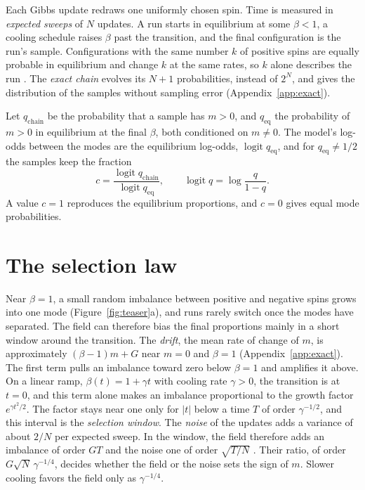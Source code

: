 \documentclass[final]{dynafront2026}
\newcommand{\qeq}{q_{\mathrm{eq}}}
\newcommand{\qchain}{q_{\mathrm{chain}}}
\DeclareMathOperator{\logit}{logit}
\begin{document}
Each Gibbs update redraws one uniformly chosen spin. Time is measured in \emph{expected sweeps} of $N$ updates. A run
starts in equilibrium at some $\beta<1$, a cooling schedule raises $\beta$
past the transition, and the final configuration is the run's sample. Configurations with
the same number $k$ of positive spins are equally probable in equilibrium and
change $k$ at the same rates, so $k$ alone describes the run
\citep{levinluczak2010}. The \emph{exact chain} evolves its $N+1$
probabilities, instead of $2^N$, and gives the distribution of the samples
without sampling error (Appendix~\ref{app:exact}).

Let $\qchain$ be the probability that a sample has $m>0$, and $\qeq$ the
probability of $m>0$ in equilibrium at the final $\beta$, both conditioned on
$m\ne0$. The model's log-odds between the modes are the equilibrium log-odds,
$\logit\qeq$, and for $\qeq\ne1/2$ the samples keep the fraction
\begin{equation}
 c=\frac{\logit\qchain}{\logit\qeq},
 \qquad \logit q=\log\frac{q}{1-q}.
 \label{eq:c}
\end{equation}
A value $c=1$ reproduces the equilibrium proportions, and $c=0$ gives equal
mode probabilities.

\section{The selection law}
\label{sec:law}

Near $\beta=1$, a small random imbalance between positive and negative spins
grows into one mode (Figure~\ref{fig:teaser}a), and runs rarely switch once the
modes have separated. The field can therefore bias the final proportions mainly
in a short window around the transition. The \emph{drift}, the mean rate of
change of $m$, is approximately $(\beta-1)m+G$ near $m=0$ and $\beta=1$
(Appendix~\ref{app:exact}). The first term pulls an imbalance toward zero below $\beta=1$ and
amplifies it above. On a linear ramp, $\beta(t)=1+\gamma t$ with cooling rate
$\gamma>0$, the transition is at $t=0$, and this term alone makes an
imbalance proportional to the growth factor $e^{\gamma t^2/2}$. The factor
stays near one only for
$|t|$ below a time $T$ of order $\gamma^{-1/2}$, and this interval is the
\emph{selection window}. The \emph{noise} of the updates adds a variance of
about $2/N$ per expected sweep. In the window, the field therefore adds an
imbalance of order $GT$ and the noise one of order $\sqrt{T/N}$ \citep[noise
scale:][]{berglundgentz2002}. Their ratio, of order $G\sqrt N\,\gamma^{-1/4}$,
decides whether the field or the noise sets the sign of $m$. Slower cooling
favors the field only as $\gamma^{-1/4}$.
\end{document}
